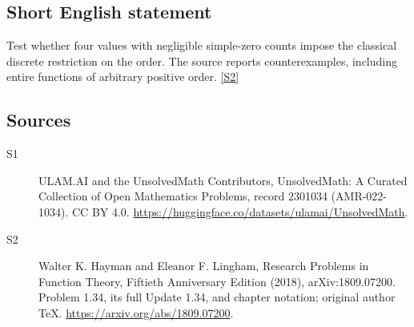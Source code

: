 \documentclass[11pt]{article}
\newcommand{\sref}[2]{\hyperlink{source:#1:#2}{[S#2]}}
\begin{document}
\subsection{Short English statement}
Test whether four values with negligible simple-zero counts impose the classical discrete restriction on the order. The source reports counterexamples, including entire functions of arbitrary positive order. \sref{2301034}{2}
\subsection{Sources}
\begin{description}
\item[\hypertarget{source:2301034:1}{S1}] ULAM.AI and the UnsolvedMath Contributors, UnsolvedMath: A Curated Collection of Open Mathematics Problems, record 2301034 (AMR-022-1034). CC BY 4.0. \url{https://huggingface.co/datasets/ulamai/UnsolvedMath}.
\item[\hypertarget{source:2301034:2}{S2}] Walter K. Hayman and Eleanor F. Lingham, Research Problems in Function Theory, Fiftieth Anniversary Edition (2018), arXiv:1809.07200. Problem 1.34, its full Update 1.34, and chapter notation; original author TeX. \url{https://arxiv.org/abs/1809.07200}.
\end{description}
\label{end:2301034}
\end{document}
